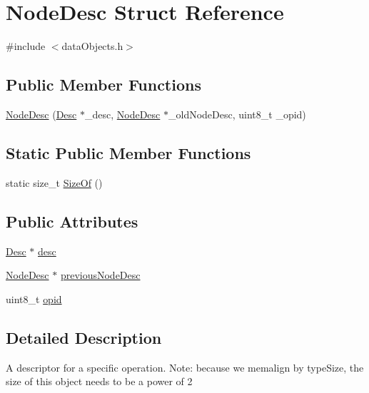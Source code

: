 \hypertarget{structNodeDesc}{}\section{Node\+Desc Struct Reference}
\label{structNodeDesc}


{\ttfamily \#include $<$data\+Objects.\+h$>$}

\subsection*{Public Member Functions}
\begin{DoxyCompactItemize}
\item 
\hyperlink{structNodeDesc_ae90ee80d4d5d720a9f383c3d843f62cf}{Node\+Desc} (\hyperlink{structDesc}{Desc} $\ast$\+\_\+desc, \hyperlink{structNodeDesc}{Node\+Desc} $\ast$\+\_\+old\+Node\+Desc, uint8\+\_\+t \+\_\+opid)
\end{DoxyCompactItemize}
\subsection*{Static Public Member Functions}
\begin{DoxyCompactItemize}
\item 
static size\+\_\+t \hyperlink{structNodeDesc_a0e3dccc523f4e1129408a038f5b9594b}{Size\+Of} ()
\end{DoxyCompactItemize}
\subsection*{Public Attributes}
\begin{DoxyCompactItemize}
\item 
\hyperlink{structDesc}{Desc} $\ast$ \hyperlink{structNodeDesc_aa0ed4419141d13e2e5b9302e9233deff}{desc}
\item 
\hyperlink{structNodeDesc}{Node\+Desc} $\ast$ \hyperlink{structNodeDesc_a834f09c58f10092fb5419ac238a38c4f}{previous\+Node\+Desc}
\item 
uint8\+\_\+t \hyperlink{structNodeDesc_a7fb5d32e8027ad439d6d096b5031bd89}{opid}
\end{DoxyCompactItemize}


\subsection{Detailed Description}
A descriptor for a specific operation. Note\+: because we memalign by type\+Size, the size of this object needs to be a power of 2 

